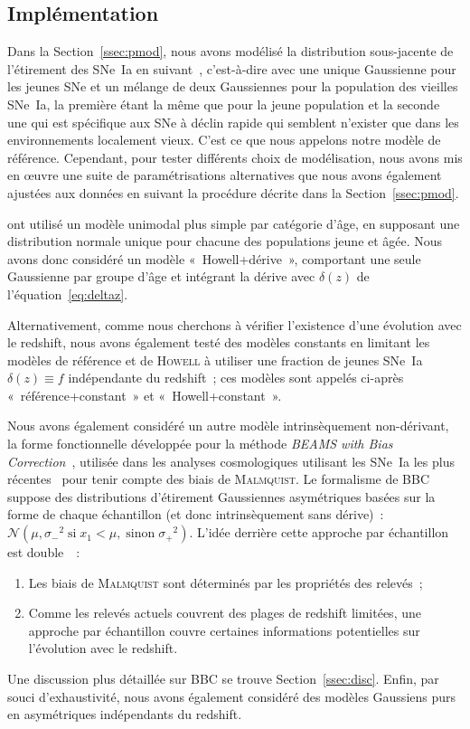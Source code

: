 \documentclass[../main/main.tex]{subfiles}
\begin{document}
\subsection{Implémentation}\label{ssec:modimpl}

Dans la Section~\ref{ssec:pmod}, nous avons modélisé la distribution
sous-jacente de l'étirement des SNe~Ia en suivant~\cite{rigault2020},
c'est-à-dire avec une unique Gaussienne pour les jeunes SNe et un mélange de
deux Gaussiennes pour la population des vieilles SNe~Ia, la première étant la
même que pour la jeune population et la seconde une qui est spécifique aux SNe à
déclin rapide qui semblent n'exister que dans les environnements localement
vieux. C'est ce que nous appelons notre modèle de référence. Cependant, pour
tester différents choix de modélisation, nous avons mis en œuvre une suite de
paramétrisations alternatives que nous avons également ajustées aux données en
suivant la procédure décrite dans la Section~\ref{ssec:pmod}.

\cite{howell2007} ont utilisé un modèle unimodal plus simple par catégorie
d'âge, en supposant une distribution normale unique pour chacune des populations
jeune et âgée. Nous avons donc considéré un modèle «~Howell+dérive~», comportant
une seule Gaussienne par groupe d'âge et intégrant la dérive avec $\delta(z)$ de
l'équation~\ref{eq:deltaz}.

Alternativement, comme nous cherchons à vérifier l'existence d'une évolution
avec le redshift, nous avons également testé des modèles constants en limitant
les modèles de référence et de \textsc{Howell} à utiliser une fraction de jeunes
SNe~Ia $\delta(z) \equiv f$ indépendante du redshift~; ces modèles sont appelés
ci-après «~référence+constant~» et «~Howell+constant~».

Nous avons également considéré un autre modèle intrinsèquement non-dérivant, la
forme fonctionnelle développée pour la méthode \textit{BEAMS with Bias
Correction}~\citep[BBC,][]{scolnic2016, kessler2017}, utilisée dans les analyses
cosmologiques utilisant les SNe~Ia les plus récentes~\citep[par
exemple][]{scolnic2018, abbott2019, riess2016, riess2019} pour tenir compte des
biais de \textsc{Malmquist}. Le formalisme de BBC suppose des distributions
d'étirement Gaussiennes asymétriques basées sur la forme de chaque échantillon
(et donc intrinsèquement sans dérive)~: $\mathcal{N}\left(\mu, \sigma_-{}^2\;
\text{si} \;x_1<\mu,\; \text{sinon} \;\sigma_+{}^2\right)$. L'idée derrière
cette approche par échantillon est double~\citep{scolnic2016, scolnic2018}~:
\begin{enumerate}
    \item Les biais de \textsc{Malmquist} sont déterminés par les propriétés des
        relevés~;
    \item Comme les relevés actuels couvrent des plages de redshift limitées,
        une approche par échantillon couvre certaines informations potentielles
        sur l'évolution avec le redshift.
\end{enumerate}
Une discussion plus détaillée sur BBC se trouve Section~\ref{ssec:disc}. Enfin,
par souci d'exhaustivité, nous avons également considéré des modèles Gaussiens
purs en asymétriques indépendants du redshift.
\end{document}
